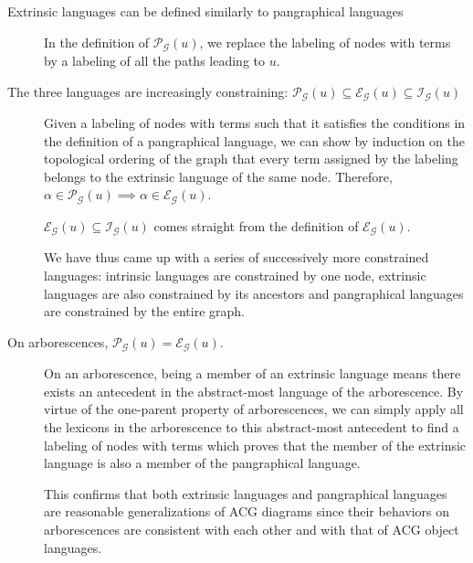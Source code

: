 \begin{description}
  \item[Extrinsic languages can be defined similarly to pangraphical
    languages] \hfill

    In the definition of $\mathcal{P}_{\mathcal{G}}(u)$, we replace the
    labeling of nodes with terms by a labeling of all the paths leading
    to $u$.

  \vspace{0.5cm}

  \item[The three languages are increasingly constraining:
    $\mathcal{P}_{\mathcal{G}}(u) \subseteq \mathcal{E}_{\mathcal{G}}(u)
    \subseteq \mathcal{I}_{\mathcal{G}}(u)$] \hfill

    Given a labeling of nodes with terms such that it satisfies the
    conditions in the definition of a pangraphical language, we can show
    by induction on the topological ordering of the graph that every
    term assigned by the labeling belongs to the extrinsic language of
    the same node. Therefore, $\alpha \in \mathcal{P}_{\mathcal{G}}(u)
    \implies \alpha \in \mathcal{E}_{\mathcal{G}}(u)$.

    $\mathcal{E}_{\mathcal{G}}(u) \subseteq
    \mathcal{I}_{\mathcal{G}}(u)$ comes straight from the definition of
    $\mathcal{E}_{\mathcal{G}}(u)$.

    We have thus came up with a series of successively more constrained
    languages: intrinsic languages are constrained by one node,
    extrinsic languages are also constrained by its ancestors and
    pangraphical languages are constrained by the entire graph.

  \vspace{0.5cm}

  \item[On arborescences, $\mathcal{P}_{\mathcal{G}}(u) =
    \mathcal{E}_{\mathcal{G}}(u)$.] \hfill

    On an arborescence, being a member of an extrinsic language means
    there exists an antecedent in the abstract-most language of the
    arborescence. By virtue of the one-parent property of arborescences,
    we can simply apply all the lexicons in the arborescence to this
    abstract-most antecedent to find a labeling of nodes with terms
    which proves that the member of the extrinsic language is also a
    member of the pangraphical language.

    This confirms that both extrinsic languages and pangraphical
    languages are reasonable generalizations of ACG diagrams since their
    behaviors on arborescences are consistent with each other and with
    that of ACG object languages.


\end{description}
